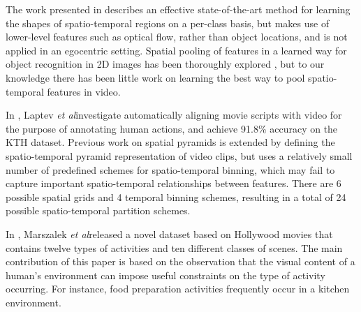 \documentclass{bmvc2k}
\def\etal{\emph{et al}\bmvaOneDot}
\begin{document}


























  The work presented in \cite{Kovashka10}
  describes an effective state-of-the-art method for learning the shapes of spatio-temporal
  regions on a per-class basis, but makes use of lower-level features such as
  optical flow, rather than object locations, and
  is not applied in an egocentric setting.
  Spatial pooling of features in a learned way for object recognition in 2D images
  has been thoroughly
  explored \cite{Sharma11}, but to our knowledge there has been little work
  on learning the best way to pool spatio-temporal features in video.

	In \cite{Laptev08}, Laptev \etal investigate automatically aligning movie scripts with
	video for the purpose of annotating human actions, and achieve 91.8\%
  accuracy on the KTH dataset. 
  Previous work on spatial pyramids \cite{Bosch07, Lazebnik06} is
  extended
  by defining the spatio-temporal pyramid representation of video clips, but uses a
  relatively small number of predefined schemes for spatio-temporal binning,
  which may fail to capture important spatio-temporal relationships between
  features. There are 6 possible spatial grids and 4 temporal binning
  schemes, resulting in a total of 24 possible spatio-temporal partition
  schemes. 
	
	In \cite{Marszalek09}, Marszalek \etal released a novel dataset based on
	Hollywood movies that contains twelve types of activities and ten
	different classes of scenes. The main contribution of this paper is based
	on the observation that the visual content of a human's environment can
	impose useful constraints on the type of activity occurring. For instance,
	food preparation activities frequently occur in a kitchen environment. 
	
\end{document}
